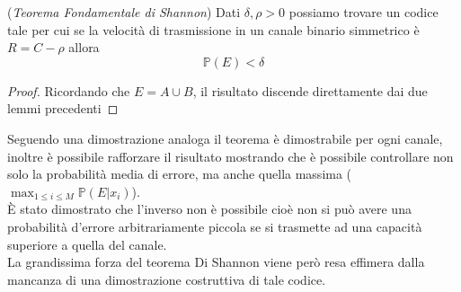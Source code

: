 \begin{teo} (\textit{Teorema Fondamentale di Shannon})
Dati $\delta , \rho > 0$ possiamo trovare un codice tale per cui se la velocità di trasmissione in un canale binario simmetrico è $R=C-\rho$ allora
$$\mathbb{P}(E)< \delta$$
\end{teo}
\begin{proof}
Ricordando che $E=A\cup B$, il risultato discende direttamente dai due lemmi precedenti
\end{proof}
Seguendo una dimostrazione analoga il teorema è dimostrabile per ogni canale, inoltre è possibile rafforzare il risultato mostrando che è possibile controllare non solo la probabilità media di errore, ma anche quella massima ($\max_{1\leq i \leq M} \mathbb{P}(E|x_i)$).\\
È stato dimostrato che l'inverso non è possibile cioè non si può avere una probabilità d'errore arbitrariamente piccola se si trasmette ad una capacità superiore a quella del canale.\\
La grandissima forza del teorema Di Shannon viene però resa effimera dalla mancanza di una dimostrazione costruttiva di tale codice.





